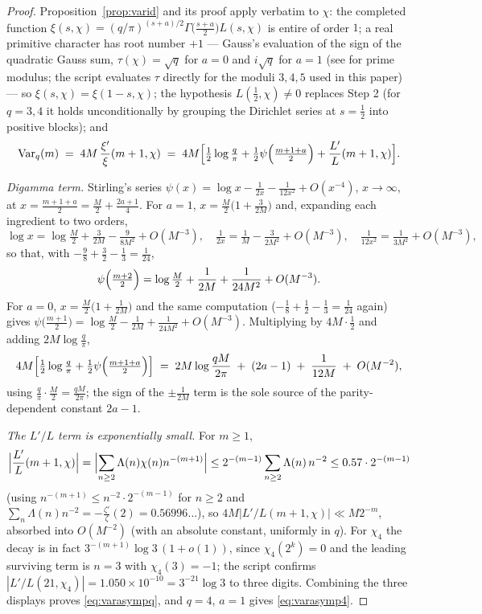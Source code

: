 \begin{proof}
Proposition~\ref{prop:varid} and its proof apply verbatim to $\chi$:
the completed function
$\xi(s,\chi)=(q/\pi)^{(s+a)/2}\Gamma\bigl(\tfrac{s+a}2\bigr)L(s,\chi)$
is entire of order $1$; a real primitive character has root number
$+1$ --- Gauss's evaluation of the sign of the quadratic Gauss sum,
$\tau(\chi)=\sqrt q$ for $a=0$ and $i\sqrt q$ for $a=1$ (see
\cite[Ch.~2]{Dav00} for prime modulus; the script evaluates
$\tau$ directly for the moduli $3,4,5$ used in this paper) --- so
$\xi(s,\chi)=\xi(1-s,\chi)$; the hypothesis
$L(\tfrac12,\chi)\ne0$ replaces Step 2 (for $q=3,4$ it holds
unconditionally by grouping the Dirichlet series at $s=\tfrac12$ into
positive blocks); and
\begin{equation}\label{eq:varidq}
\mathrm{Var}_q(m)\;=\;4M\,\frac{\xi'}{\xi}(m+1,\chi)
\;=\;4M\Bigl[\tfrac12\log\tfrac q\pi
+\tfrac12\psi\Bigl(\tfrac{m+1+a}2\Bigr)+\frac{L'}{L}(m+1,\chi)\Bigr].
\end{equation}

\emph{Digamma term.} Stirling's series
$\psi(x)=\log x-\tfrac1{2x}-\tfrac1{12x^2}+O(x^{-4})$, $x\to\infty$,
at $x=\tfrac{m+1+a}2=\tfrac M2+\tfrac{2a+1}4$. For $a=1$,
$x=\tfrac M2\bigl(1+\tfrac3{2M}\bigr)$ and, expanding each ingredient
to two orders,
\[
\log x=\log\tfrac M2+\tfrac3{2M}-\tfrac9{8M^2}+O(M^{-3}),\quad
\tfrac1{2x}=\tfrac1M-\tfrac3{2M^2}+O(M^{-3}),\quad
\tfrac1{12x^2}=\tfrac1{3M^2}+O(M^{-3}),
\]
so that, with $-\tfrac98+\tfrac32-\tfrac13=\tfrac1{24}$,
\[
\psi\Bigl(\tfrac{m+2}2\Bigr)=\log\tfrac M2+\frac1{2M}
+\frac{1}{24M^2}+O(M^{-3}).
\]
For $a=0$, $x=\tfrac M2\bigl(1+\tfrac1{2M}\bigr)$ and the same
computation ($-\tfrac18+\tfrac12-\tfrac13=\tfrac1{24}$ again) gives
$\psi\bigl(\tfrac{m+1}2\bigr)=\log\tfrac M2-\tfrac1{2M}
+\tfrac1{24M^2}+O(M^{-3})$. Multiplying by $4M\cdot\tfrac12$ and adding
$2M\log\tfrac q\pi$,
\[
4M\Bigl[\tfrac12\log\tfrac q\pi+\tfrac12\psi\Bigl(\tfrac{m+1+a}2\Bigr)\Bigr]
\;=\;2M\log\frac{qM}{2\pi}\;+\;(2a-1)\;+\;\frac1{12M}\;+\;O(M^{-2}),
\]
using $\tfrac q\pi\cdot\tfrac M2=\tfrac{qM}{2\pi}$; the sign of the
$\pm\tfrac1{2M}$ term is the sole source of the parity-dependent
constant $2a-1$.

\emph{The $L'/L$ term is exponentially small.} For $m\ge1$,
\[
\Bigl|\frac{L'}{L}(m+1,\chi)\Bigr|
=\Bigl|\sum_{n\ge2}\Lambda(n)\chi(n)n^{-(m+1)}\Bigr|
\le2^{-(m-1)}\sum_{n\ge2}\Lambda(n)\,n^{-2}
\le0.57\cdot2^{-(m-1)}
\]
(using $n^{-(m+1)}\le n^{-2}\cdot2^{-(m-1)}$ for $n\ge2$ and
$\sum_n\Lambda(n)n^{-2}=-\tfrac{\zeta'}{\zeta}(2)=0.56996\ldots$),
so $4M|L'/L(m+1,\chi)|\ll M2^{-m}$, absorbed into $O(M^{-2})$ (with an
absolute constant, uniformly in $q$). For $\chi_4$ the decay is in fact
$3^{-(m+1)}\log3\,(1+o(1))$, since $\chi_4(2^k)=0$ and the leading
surviving term is $n=3$ with $\chi_4(3)=-1$; the script confirms
$|L'/L(21,\chi_4)|=1.050\times10^{-10}=3^{-21}\log3$ to three digits.
Combining the three displays proves \eqref{eq:varasympq}, and $q=4$,
$a=1$ gives \eqref{eq:varasymp4}.
\end{proof}

